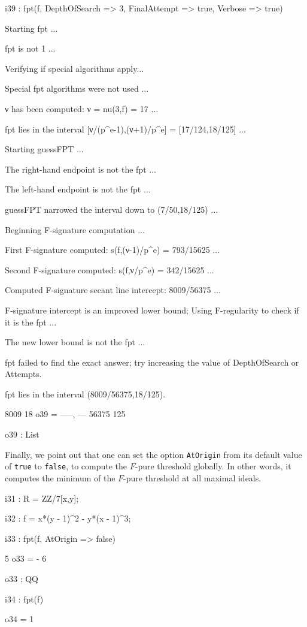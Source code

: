 \documentclass{amsart}
\begin{document}
\medskip
{\small
{}
\begin{MyVerbatim}
i39 : fpt(f, DepthOfSearch => 3, FinalAttempt => true, Verbose => true)

Starting fpt ...

fpt is not 1 ...

Verifying if special algorithms apply...

Special fpt algorithms were not used ...

ν has been computed: ν = nu(3,f) = 17 ...

fpt lies in the interval [ν/(p^e-1),(ν+1)/p^e] = [17/124,18/125] ...

Starting guessFPT ...

The right-hand endpoint is not the fpt ...

The left-hand endpoint is not the fpt ...

guessFPT narrowed the interval down to (7/50,18/125) ...

Beginning F-signature computation ...

First F-signature computed: s(f,(ν-1)/p^e) = 793/15625 ...

Second F-signature computed: s(f,ν/p^e) = 342/15625 ...

Computed F-signature secant line intercept: 8009/56375 ...

F-signature intercept is an improved lower bound;
Using F-regularity to check if it is the fpt ...

The new lower bound is not the fpt ...

fpt failed to find the exact answer; try increasing the value of
DepthOfSearch or Attempts.

fpt lies in the interval (8009/56375,18/125).

        8009   18
o39 = {-----, ---}
       56375  125

o39 : List
\end{MyVerbatim}
}
\medskip

Finally, we point out that one can set the option \texttt{AtOrigin} from its default value of \texttt{true} to \texttt{false}, to compute the $F$-pure threshold globally. In other words, it computes the minimum of the $F$-pure threshold at all maximal ideals.

\medskip
{\small
{}
\begin{MyVerbatim}
i31 : R = ZZ/7[x,y];

i32 : f = x*(y - 1)^2 - y*(x - 1)^3;

i33 : fpt(f, AtOrigin => false)

      5
o33 = -
      6

o33 : QQ

i34 : fpt(f)

o34 = 1
\end{MyVerbatim}
}
\medskip
\end{document}
